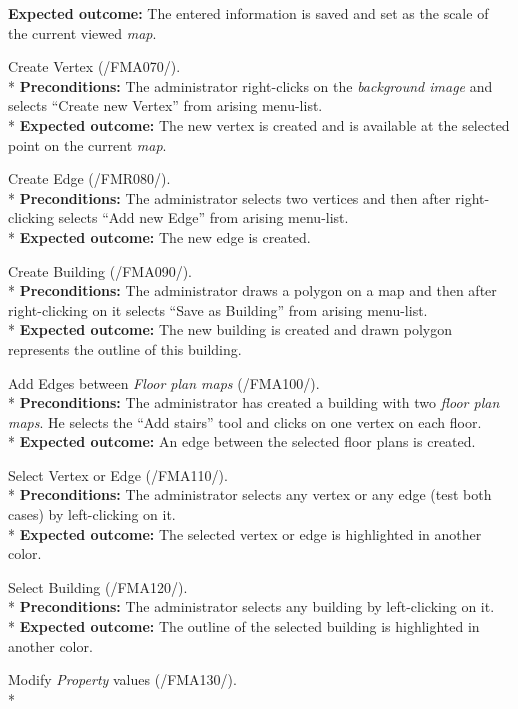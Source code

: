 \begin{numerate}[ATC]
	\textbf{Expected outcome:} The entered information is saved and set as the scale of the current viewed \textit{map}.
\item Create Vertex (/FMA070/). \\*
	\textbf{Preconditions:} The administrator right-clicks on the \textit{background image} and selects ``Create new Vertex'' from arising menu-list. \\*
	\textbf{Expected outcome:} The new vertex is created and is available at the selected point on the current \textit{map}.
\item Create Edge (/FMR080/). \\*
	\textbf{Preconditions:} The administrator selects two vertices and then after right-clicking selects ``Add new Edge'' from arising menu-list. \\*
	\textbf{Expected outcome:} The new edge is created.
\item Create Building (/FMA090/). \\*
	\textbf{Preconditions:} The administrator draws a polygon on a map and then after right-clicking on it selects ``Save as Building'' from arising menu-list.\\*
	\textbf{Expected outcome:} The new building is created and drawn polygon represents the outline of this building.
\item Add Edges between \textit{Floor plan maps} (/FMA100/). \\*
	\textbf{Preconditions:}	The administrator has created a building with two \textit{floor plan maps}. He selects the ``Add stairs'' tool and clicks on one vertex on each floor. \\*
	\textbf{Expected outcome:} An edge between the selected floor plans is created.
\item Select Vertex or Edge (/FMA110/). \\*
	\textbf{Preconditions:} The administrator selects any vertex or any edge (test both cases) by left-clicking on it.\\*
	\textbf{Expected outcome:} The selected vertex or edge is highlighted in another color.
\item Select Building (/FMA120/). \\*
	\textbf{Preconditions:} The administrator selects any building by left-clicking on it.\\*
	\textbf{Expected outcome:} The outline of the selected building is highlighted in another color.
\item Modify \textit{Property} values (/FMA130/). \\*

\end{numerate}
